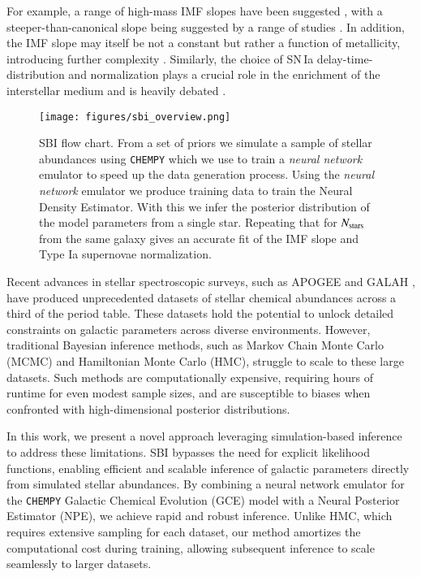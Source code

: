\documentclass{aa}
\begin{document}
For example, a range of high-mass IMF slopes have been suggested \citep[Tab.\,7]{2016ApJ...824...82C}, with a steeper-than-canonical slope being suggested by a range of studies \citep[e.g.][]{2015ApJ...806..198W,Rybizki2015,Chabrier2014}. In addition, the IMF slope may itself be not a constant but rather a function of metallicity, introducing further complexity \citep[e.g.][]{2019MNRAS.482..118G,Martin2019}. Similarly, the choice of SN\,Ia delay-time-distribution and normalization plays a crucial role in the enrichment of the interstellar medium \citep[ISM; e.g.][]{Buck2021} and is heavily debated \citep{2010ApJ...722.1879M,2012MNRAS.426.3282M,2015ApJ...810..137J}.

\begin{figure*}[]
     \centering
     \texttt{[image: figures/sbi\_overview.png]}
     \vspace{-.5cm}
     \caption{SBI flow chart. From a set of priors we simulate a sample of stellar abundances using \texttt{CHEMPY} \citep{Rybizki_2017,Philcox_2019} which we use to train a \emph{neural network} emulator to speed up the data generation process. Using the \emph{neural network} emulator we produce training data to train the Neural Density Estimator. With this we infer the posterior distribution of the model parameters from a single star. Repeating that for $N_{\rm stars}$ from the same galaxy gives an accurate fit of the IMF slope and Type Ia supernovae normalization.}
     \label{fig:flowchart}
\end{figure*}

Recent advances in stellar spectroscopic surveys, such as APOGEE \citep{apogee17} and GALAH \citep{Buder2021,Buder2024}, have produced unprecedented datasets of stellar chemical abundances across a third of the period table. These datasets hold the potential to unlock detailed constraints on galactic parameters across diverse environments. However, traditional Bayesian inference methods, such as Markov Chain Monte Carlo (MCMC) and Hamiltonian Monte Carlo (HMC), struggle to scale to these large datasets. Such methods are computationally expensive, requiring hours of runtime for even modest sample sizes, and are susceptible to biases when confronted with high-dimensional posterior distributions.

In this work, we present a novel approach leveraging simulation-based inference \citep[SBI, e.g.][]{Cranmer2020} to address these limitations. SBI bypasses the need for explicit likelihood functions, enabling efficient and scalable inference of galactic parameters directly from simulated stellar abundances. By combining a neural network emulator for the \texttt{CHEMPY} Galactic Chemical Evolution (GCE) model with a Neural Posterior Estimator (NPE), we achieve rapid and robust inference. Unlike HMC, which requires extensive sampling for each dataset, our method amortizes the computational cost during training, allowing subsequent inference to scale seamlessly to larger datasets.
\end{document}
